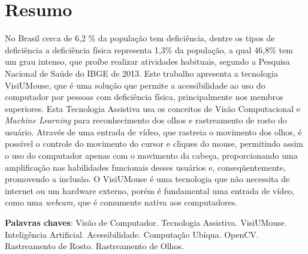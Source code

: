 \chapter*{Resumo}

\begin{singlespace}
{\fontsize{12pt}{\baselineskip} \selectfont \noindent
No Brasil cerca de 6,2 \% da população tem deficiência, dentre os tipos de deficiência a deficiência física representa 1,3\% da população, a qual 46,8\% tem um grau intenso, que proíbe realizar atividades habituais, segundo a Pesquisa  Nacional de Saúde do IBGE de 2013. Este trabalho apresenta a tecnologia VisiUMouse, que é uma solução que permite a acessibilidade ao uso do computador por pessoas com deficiência física, principalmente nos membros superiores. Esta Tecnologia Assistiva usa os conceitos de Visão Computacional e \textit{Machine Learning} para reconhecimento dos olhos e rastreamento de rosto do usuário. Através de uma entrada de vídeo, que rastreia o movimento dos olhos, é possível o controle do movimento do cursor e cliques do mouse, permitindo assim o uso do computador apenas com o movimento da cabeça, proporcionando uma amplificação nas habilidades funcionais desses usuários e, conseqüentemente, promovendo a inclusão. O VisiUMouse é uma tecnologia que não necessita de internet ou um hardware externo, porém é fundamental uma entrada de vídeo, como uma \textit{webcam}, que é comumente nativa aos computadores. 
}
\end{singlespace}

\begin{singlespace}
\noindent \onehalfspacing
\textbf{Palavras chaves}: Visão de Computador. Tecnologia Assistiva. VisiUMouse. Inteligência Artificial. Acessibilidade. Computação Ubíqua. OpenCV. Rastreamento de Rosto. Rastreamento de Olhos.
\end{singlespace}


